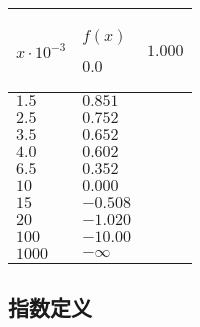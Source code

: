 \documentclass{ctexart}
\begin{document}
\begin{longtable}{|>{\centering\arraybackslash}p{2em}|>{\centering\arraybackslash}p{4em}|}

    \hline

    $x \cdot 10^{-3}$ & $f(x)$    \endhead

    \hline

    $ 0.0 $           & $1.000$            \\

    \hline

    $ 1.5 $           & $0.851$            \\

    \hline

    $ 2.5 $           & $0.752$            \\

    \hline

    $ 3.5 $           & $0.652$            \\

    \hline

    $ 4.0 $           & $0.602$            \\

    \hline

    $ 6.5 $           & $0.352$            \\

    \hline

    $ 10 $            & $0.000$            \\

    \hline

    $ 15 $            & $-0.508$           \\

    \hline

    $ 20 $            & $-1.020$           \\

    \hline

    $ 100 $           & $-10.00$           \\

    \hline

    $ 1000 $          & $-\infty$          \\

    \hline
\end{longtable}



\subsection{指数定义}
\label{sec:idxdef}
\end{document}
